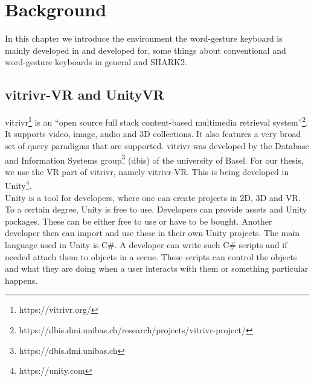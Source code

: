 \chapter{Background}

In this chapter we introduce the environment the word-gesture keyboard is mainly developed in and developed for, some things about conventional and word-gesture keyboards in general and SHARK2.

\section{vitrivr-VR and UnityVR}
vitrivr\footnote{https://vitrivr.org/} is an ``open source full stack content-based multimedia retrieval system''\footnote{https://dbis.dmi.unibas.ch/research/projects/vitrivr-project/}. It supports video, image, audio and 3D collections. It also features a very broad set of query paradigms that are supported. vitrivr was developed by the Database and Information Systems group\footnote{https://dbis.dmi.unibas.ch} (dbis) of the university of Basel. For our thesis, we use the VR part of vitrivr, namely vitrivr-VR. This is being developed in Unity\footnote{https://unity.com}.\\
Unity is a tool for developers, where one can create projects in 2D, 3D and VR. To a certain degree, Unity is free to use. Developers can provide assets and Unity packages. These can be either free to use or have to be bought. Another developer then can import and use these in their own Unity projects. The main language used in Unity is C\#. A developer can write such C\# scripts and if needed attach them to objects in a scene. These scripts can control the objects and what they are doing when a user interacts with them or something particular happens. 

